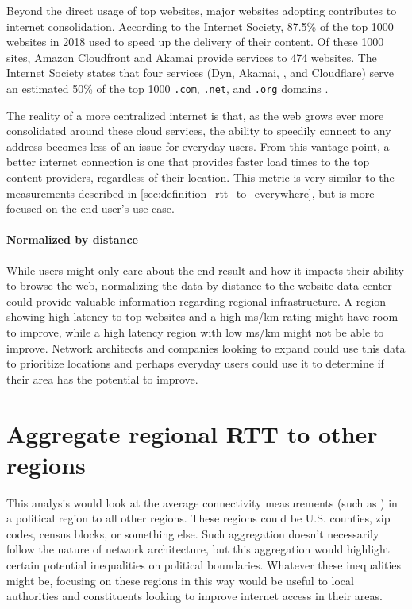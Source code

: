 Beyond the direct usage of top websites, major websites adopting \cdns contributes to internet consolidation. According to the Internet Society, 87.5\% of the top 1000 websites in 2018 used \cdns to speed up the delivery of their content. Of these 1000 sites, Amazon Cloudfront and Akamai provide \cdn services to 474 websites. The Internet Society states that four services (Dyn, Akamai, \AWS, and Cloudflare) serve an estimated 50\% of the top 1000 \texttt{.com}, \texttt{.net}, and \texttt{.org} domains \cite{TheInternetSociety2019}.

The reality of a more centralized internet is that, as the web grows ever more consolidated around these cloud services, the ability to speedily connect to any \ip address becomes less of an issue for everyday users. From this vantage point, a better internet connection is one that provides faster load times to the top content providers, regardless of their location. This metric is very similar to the \rtt measurements described in \ref{sec:definition_rtt_to_everywhere}, but is more focused on the end user's use case.

\paragraph{Normalized by distance}
While users might only care about the end result and how it impacts their ability to browse the web, normalizing the data by distance to the website data center could provide valuable information regarding regional infrastructure. A region showing high latency to top websites and a high ms/km rating might have room to improve, while a high latency region with low ms/km might not be able to improve. Network architects and companies looking to expand could use this data to prioritize locations and perhaps everyday users could use it to determine if their area has the potential to improve.

\section{Aggregate regional RTT to other regions}

This analysis would look at the average connectivity measurements (such as \rtt) in a political region to all other regions. These regions could be U.S. counties, zip codes, census blocks, or something else. Such aggregation doesn't necessarily follow the nature of network architecture, but this aggregation would highlight certain potential inequalities on political boundaries. Whatever these inequalities might be, focusing on these regions in this way would be useful to local authorities and constituents looking to improve internet access in their areas.

